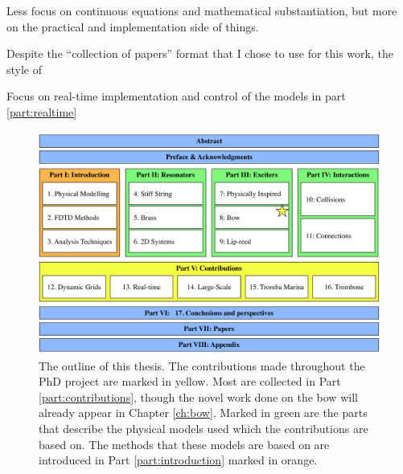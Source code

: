 Less focus on continuous equations and mathematical substantiation, but more on the practical and implementation side of things.

Despite the ``collection of papers'' format that I chose to use for this work, the style of  


Focus on real-time implementation and control of the models in part \ref{part:realtime}

\begin{figure}[h]
    \centering
    \includegraphics[width=\textwidth]{figures/intro/thesisOverview.pdf}
    \caption{\label{fig:thesisOutline} The outline of this thesis. The contributions made throughout the PhD project are marked in yellow. Most are collected in Part \ref{part:contributions}, though the novel work done on the bow will already appear in Chapter \ref{ch:bow}. Marked in green are the parts that describe the physical models used which the contributions are based on. The methods that these models are based on are introduced in Part \ref{part:introduction} marked in orange.}
\end{figure}